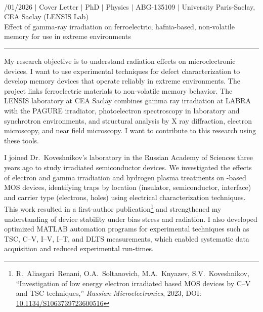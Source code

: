 \documentclass[a4paper,12pt]{article}
\begin{document}
{\centering
  {\scshape {}} \\ 
  {\fontsize{10}{10}/01/2026} $|$
  {\fontsize{10}{10}\selectfont Cover Letter} $|$
  {\fontsize{10}{10}\selectfont PhD} $|$
  {\fontsize{10}{10}\selectfont Physics} $|$
  {\fontsize{10}{10}\selectfont ABG-135109} $|$  
  {\fontsize{10}{10}\selectfont University Paris-Saclay, CEA Saclay (LENSIS Lab)} \\
  {\fontsize{10}{10}\selectfont Effect of gamma-ray irradiation on
  ferroelectric, hafnia-based, non-volatile memory for use in extreme
  environments}
\par}
\vspace{-15pt}
\noindent\rule{\textwidth}{0.5pt}

\vspace{-5pt}

My research objective is to understand radiation effects on microelectronic devices. I want to use experimental techniques for defect characterization to develop memory devices that operate reliably in extreme environments. The project links ferroelectric  materials to non-volatile memory behavior. The LENSIS laboratory at CEA Saclay combines gamma ray irradiation at LABRA with the PAGURE irradiator, photoelectron spectroscopy in laboratory and synchrotron environments, and structural analysis by X ray diffraction, electron microscopy, and near field microscopy. I want to contribute to this research using these tools.

I joined Dr.\ Koveshnikov's laboratory in the Russian Academy of Sciences three years ago to study irradiated semiconductor devices. We investigated the effects of electron and gamma irradiation and hydrogen plasma treatments on -based MOS devices, identifying traps by location (insulator, semiconductor, interface) and carrier type (electrons, holes) using electrical characterization techniques. This work resulted in a first-author publication\footnote{R.~Aliasgari~Renani, O.A.~Soltanovich, M.A.~Knyazev, S.V.~Koveshnikov, ``Investigation of low energy electron irradiated  based MOS devices by C--V and TSC techniques,'' \textit{Russian Microelectronics}, 2023, DOI: \href{https://doi.org/10.1134/S1063739723600516}{10.1134/S1063739723600516}} and strengthened my understanding of device stability under bias stress and radiation. I also developed optimized MATLAB automation programs for experimental techniques such as TSC, C--V, I--V, I--T, and DLTS measurements, which enabled systematic data acquisition and reduced experimental run-times.
\end{document}
